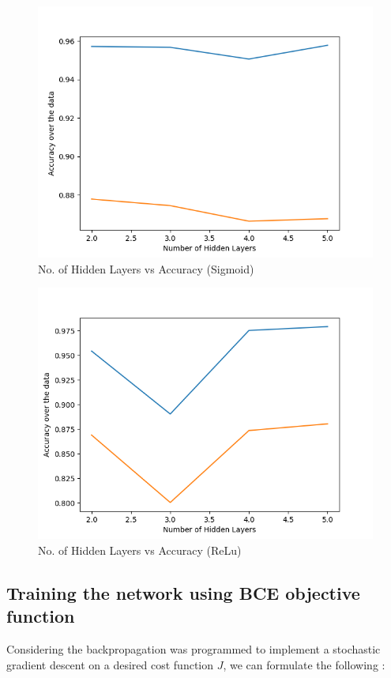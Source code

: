 \documentclass[11pt]{article}
\begin{document}
\begin{figure}[H]
  \includegraphics[width=\linewidth]{e_sigmoid_plot.png}
  \caption{No. of Hidden Layers vs Accuracy (Sigmoid)}
  \label{fig1B}
\end{figure}
\begin{figure}[H]
  \includegraphics[width=\linewidth]{e_ReLu_plot.png}
  \caption{No. of Hidden Layers vs Accuracy (ReLu)}
  \label{fig1B}
\end{figure}
\subsection{Training the network using BCE objective function}
Considering the backpropagation was programmed to implement a stochastic gradient descent on a desired cost function $J$, we can formulate the following :
\end{document}
